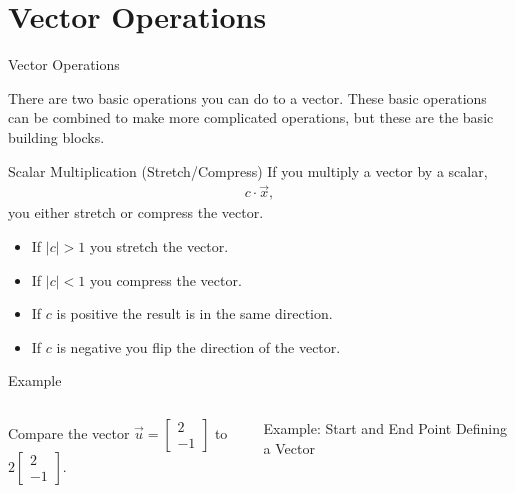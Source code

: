 \documentclass[svgnames,table,,aspectratio=169]{beamer}
\newcommand{\columnVector}[1]{%
  \left[
    \begin{array}{r}
    #1                           
    \end{array}
  \right]
}
\begin{document}
\section{Vector Operations}

\begin{frame}{Vector Operations}

  There are two basic operations you can do to a vector. These basic
  operations can be combined to make more complicated operations, but
  these are the basic building blocks.

  \begin{block}{Scalar Multiplication (Stretch/Compress)}
    If you multiply a vector by a scalar,
    \begin{eqnarray*}
      c\cdot \vec{x},
    \end{eqnarray*}
    you either stretch or
    compress the vector.
    \begin{itemize}
    \item If $|c|>1$ you stretch the vector.
    \item If $|c|<1$ you compress the vector.
    \item If $c$ is positive the result is in the same direction.
    \item If $c$ is negative you flip the direction of the vector.
    \end{itemize}
  \end{block}
  
\end{frame}

\begin{frame}{Example}

    \begin{columns}

      Compare the vector $\vec{u}=\columnVector{2 \\ -1}$ to
      $2\columnVector{2 \\ -1}$.

    Example: Start and End Point Defining a Vector

  \end{columns}

  
\end{frame}
\end{document}
